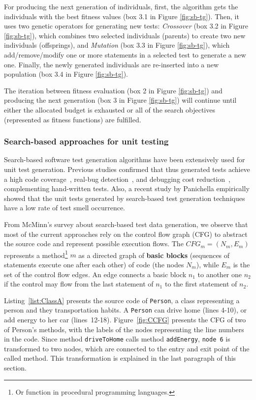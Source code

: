 For producing the next generation of individuals, first, the algorithm gets the individuals with the best fitness values (box 3.1 in Figure \ref{fig:sb-tg}). Then, it uses two genetic operators for generating new tests: \textit{Crossover} (box 3.2 in Figure \ref{fig:sb-tg}), which combines two selected individuals (parents) to create two new individuals (offsprings), and \textit{Mutation} (box 3.3 in Figure \ref{fig:sb-tg}), which add/remove/modify one or more statements in a selected test to generate a new one. Finally, the newly generated individuals are re-inserted into a new population (box 3.4 in Figure \ref{fig:sb-tg}).


The iteration between fitness evaluation (box 2 in Figure \ref{fig:sb-tg}) and producing the next generation (box 3 in Figure \ref{fig:sb-tg}) will continue until either the allocated budget is exhausted or all of the search objectives (represented as fitness functions) are fulfilled.

\subsubsection{Search-based approaches for unit testing}
Search-based software test generation algorithms have been extensively used for unit test generation. Previous studies confirmed that thus generated tests achieve a high code coverage~\cite{Panichella2018a, Campos2018}, real-bug detection~\cite{almasi2017industrial}, and debugging cost reduction~\cite{soltani2017, Panichella2016}, complementing hand-written tests. Also, a recent study by Panichella \etal \cite{panichella2020} empirically showed that the unit tests generated by search-based test generation techniques have a low rate of test smell occurrence.

From McMinn's \cite{McMinn2004} survey about search-based test data generation, we observe that most of the current approaches rely on the control flow graph (CFG) to abstract the source code and represent possible execution flows. The $CFG_m=(N_m,E_m)$ represents a method\footnote{Or function in procedural programming languages.} $m$ as a directed graph of \textbf{basic blocks} (\ie sequences of statements execute one after each other) of code (the nodes $N_m$), while $E_m$ is the set of the control flow edges. An edge connects a basic block $n_1$ to another one $n_2$ if the control may flow from the last statement of $n_1$ to the first statement of $n_2$. 

Listing~\ref{list:ClassA} presents the source code of \texttt{Person}, a class representing a person and they transportation habits. A \texttt{Person} can drive home (lines 4-10), or add energy to her car (lines~12-18). Figure~\ref{fig:CCFG} presents the CFG of two of Person's methods, with the labels of the nodes representing the line numbers in the code. Since method \texttt{driveToHome} calls method \texttt{addEnergy}, \texttt{node 6} is transformed to two nodes, which are connected to the entry and exit point of the called method. This transformation is explained in the last paragraph of this section.  

